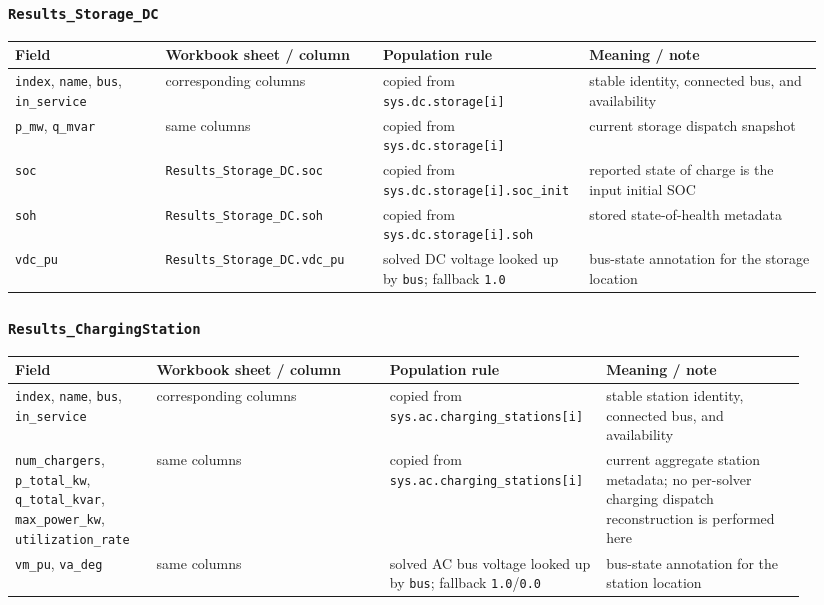 \subsubsection*{\texttt{Results\_Storage\_DC}}

\begin{longtable}{@{}L{0.18\linewidth}L{0.26\linewidth}L{0.22\linewidth}L{0.28\linewidth}@{}}
\toprule
Field & Workbook sheet / column & Population rule & Meaning / note \\
\midrule
\endhead
\texttt{index}, \texttt{name}, \texttt{bus}, \texttt{in\_service} & corresponding columns & copied from \texttt{sys.dc.storage[i]} & stable identity, connected bus, and availability \\
\texttt{p\_mw}, \texttt{q\_mvar} & same columns & copied from \texttt{sys.dc.storage[i]} & current storage dispatch snapshot \\
\texttt{soc} & \texttt{Results\_Storage\_DC.soc} & copied from \texttt{sys.dc.storage[i].soc\_init} & reported state of charge is the input initial SOC \\
\texttt{soh} & \texttt{Results\_Storage\_DC.soh} & copied from \texttt{sys.dc.storage[i].soh} & stored state-of-health metadata \\
\texttt{vdc\_pu} & \texttt{Results\_Storage\_DC.vdc\_pu} & solved DC voltage looked up by \texttt{bus}; fallback \texttt{1.0} & bus-state annotation for the storage location \\
\bottomrule
\end{longtable}

\subsubsection*{\texttt{Results\_ChargingStation}}

\begin{longtable}{@{}L{0.17\linewidth}L{0.29\linewidth}L{0.22\linewidth}L{0.24\linewidth}@{}}
\toprule
Field & Workbook sheet / column & Population rule & Meaning / note \\
\midrule
\endhead
\texttt{index}, \texttt{name}, \texttt{bus}, \texttt{in\_service} & corresponding columns & copied from \texttt{sys.ac.charging\_stations[i]} & stable station identity, connected bus, and availability \\
\texttt{num\_chargers}, \texttt{p\_total\_kw}, \texttt{q\_total\_kvar}, \texttt{max\_power\_kw}, \texttt{utilization\_rate} & same columns & copied from \texttt{sys.ac.charging\_stations[i]} & current aggregate station metadata; no per-solver charging dispatch reconstruction is performed here \\
\texttt{vm\_pu}, \texttt{va\_deg} & same columns & solved AC bus voltage looked up by \texttt{bus}; fallback \texttt{1.0}/\texttt{0.0} & bus-state annotation for the station location \\
\bottomrule
\end{longtable}


